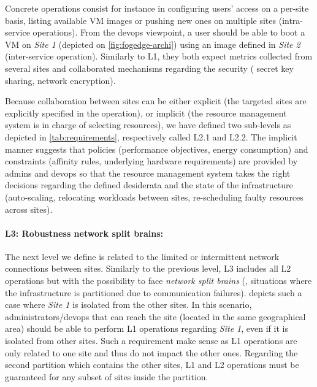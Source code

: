 Concrete operations consist for instance in configuring users'
access on a per-site basis, listing available VM images or pushing new
ones on multiple sites (intra-service operations). From the
devops viewpoint, a user should be able to boot a VM on \emph{Site 1} (depicted
on \cref{fig:fogedge-archi}) using an image defined in \emph{Site 2}
(inter-service operation). Similarly to L1, they both expect metrics collected
from several sites and collaborated mechanisms regarding the security (\eg
secret key sharing, network encryption).

Because collaboration between sites can be either explicit (\ie the
targeted sites are explicitly specified in the operation), or implicit
(\ie the resource management system is in charge of selecting
resources), we have defined two sub-levels as depicted in
\cref{tab:requirements}, respectively called L2.1 and L2.2. The implicit
manner suggests that policies (\eg performance objectives, energy
consumption) and constraints (\eg affinity rules, underlying hardware
requirements) are provided by admins and devops so that the resource management
system takes the right decisions regarding the defined desiderata and the state
of the infrastructure (\eg auto-scaling, relocating workloads between sites,
re-scheduling faulty resources across sites).

\paragraph{L3: Robustness \wrt network split brains:}
The next level we define is related to the limited or intermittent
network connections between sites. Similarly to the previous level,
L3 includes all L2 operations but with the possibility to face
\emph{network split brains} (\ie, situations where the infrastructure is
partitioned due to communication failures).
%
 depicts such a case where \emph{Site 1} is isolated
from the other sites. In this scenario, administrators/devops that can reach
the site (\ie located in the same geographical area) should be able to perform
L1 operations regarding \emph{Site 1}, even if it is isolated from other sites.
Such a requirement make sense as L1 operations are only related to one site and
thus do not impact the other ones.
%
Regarding the second partition which contains the other sites, L1 and L2
operations must be guaranteed for any subset of sites inside the partition.

